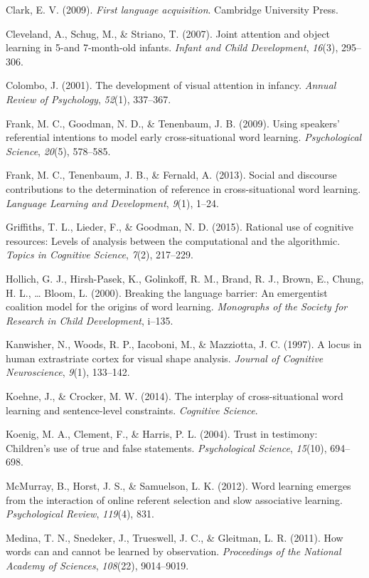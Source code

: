 \documentclass[a4paper,man,floatsintext]{apa6}
\begin{document}
Clark, E. V. (2009). \emph{First language acquisition}. Cambridge
University Press.

Cleveland, A., Schug, M., \& Striano, T. (2007). Joint attention and
object learning in 5-and 7-month-old infants. \emph{Infant and Child
Development}, \emph{16}(3), 295--306.

Colombo, J. (2001). The development of visual attention in infancy.
\emph{Annual Review of Psychology}, \emph{52}(1), 337--367.

Frank, M. C., Goodman, N. D., \& Tenenbaum, J. B. (2009). Using
speakers' referential intentions to model early cross-situational word
learning. \emph{Psychological Science}, \emph{20}(5), 578--585.

Frank, M. C., Tenenbaum, J. B., \& Fernald, A. (2013). Social and
discourse contributions to the determination of reference in
cross-situational word learning. \emph{Language Learning and
Development}, \emph{9}(1), 1--24.

Griffiths, T. L., Lieder, F., \& Goodman, N. D. (2015). Rational use of
cognitive resources: Levels of analysis between the computational and
the algorithmic. \emph{Topics in Cognitive Science}, \emph{7}(2),
217--229.

Hollich, G. J., Hirsh-Pasek, K., Golinkoff, R. M., Brand, R. J., Brown,
E., Chung, H. L., \ldots{} Bloom, L. (2000). Breaking the language
barrier: An emergentist coalition model for the origins of word
learning. \emph{Monographs of the Society for Research in Child
Development}, i--135.

Kanwisher, N., Woods, R. P., Iacoboni, M., \& Mazziotta, J. C. (1997). A
locus in human extrastriate cortex for visual shape analysis.
\emph{Journal of Cognitive Neuroscience}, \emph{9}(1), 133--142.

Koehne, J., \& Crocker, M. W. (2014). The interplay of cross-situational
word learning and sentence-level constraints. \emph{Cognitive Science}.

Koenig, M. A., Clement, F., \& Harris, P. L. (2004). Trust in testimony:
Children's use of true and false statements. \emph{Psychological
Science}, \emph{15}(10), 694--698.

McMurray, B., Horst, J. S., \& Samuelson, L. K. (2012). Word learning
emerges from the interaction of online referent selection and slow
associative learning. \emph{Psychological Review}, \emph{119}(4), 831.

Medina, T. N., Snedeker, J., Trueswell, J. C., \& Gleitman, L. R.
(2011). How words can and cannot be learned by observation.
\emph{Proceedings of the National Academy of Sciences}, \emph{108}(22),
9014--9019.
\end{document}
